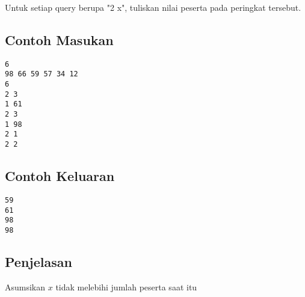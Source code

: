 \documentclass{article}
\begin{document}
Untuk setiap query berupa "2 x", tuliskan nilai peserta pada peringkat tersebut.
\\

\begin{multicols}{2}
\subsection*{Contoh Masukan}
\begin{lstlisting}
6
98 66 59 57 34 12
6
2 3
1 61
2 3
1 98
2 1
2 2
\end{lstlisting}
\columnbreak
\subsection*{Contoh Keluaran}
\begin{lstlisting}
59
61
98
98
\end{lstlisting}
\vfill
\null
\end{multicols}

\subsection*{Penjelasan}
Asumsikan $x$ tidak melebihi jumlah peserta saat itu

\pagebreak
\end{document}
